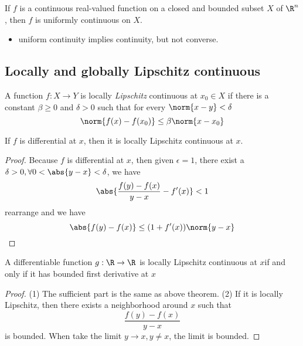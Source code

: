\begin{refsection}
\begin{corollary}
If $f$ is a continuous real-valued function on a closed and bounded subset $X$ of $\R^n$, then $f$ is uniformly continuous on $X$.
\end{corollary}

\begin{remark}\hfill
\begin{itemize}
	\item uniform continuity implies continuity, but not converse. 
\end{itemize}
\end{remark}


\subsection{Locally and globally Lipschitz continuous}
\begin{definition}
A function $f:X\rightarrow Y$ is locally \emph{Lipschitz} continuous at $x_0 \in X$ if there is a constant $\beta \geq 0$ and $\delta > 0$ such that for every $\norm{x-y} < \delta$
$$\norm{f(x)-f(x_0)} \leq \beta \norm{x-x_0}$$
\end{definition}

\begin{lemma}
\cite[312]{johnsonbaugh2010foundations}
If $f$ is differential at $x$, then it is locally Lipschitz continuous at $x$.
\end{lemma}
\begin{proof}
Because $f$ is differential at $x$, then given $\epsilon = 1$, there exist a $\delta > 0 ,\forall 0<\abs{y-x} < \delta$, we have
$$\abs{\frac{f(y)-f(x)}{y-x} - f'(x)} < 1$$
rearrange and we have
$$\abs{f(y)-f(x)} \leq (1+f'(x))\norm{y-x}$$
\end{proof}

\begin{lemma}
A differentiable function $g: \R \to \R$ is locally Lipschitz continuous at $x$if and only if it has bounded first derivative at $x$
\end{lemma}
\begin{proof}
(1) The sufficient part is the same as above theorem. (2) If it is locally Lipschitz, then there exists a neighborhood around $x$ such that $$\frac{f(y)-f(x)}{y-x}$$ is bounded. When take the limit $y\to x,y\neq x$, the limit is bounded.
\end{proof}




\end{refsection}
